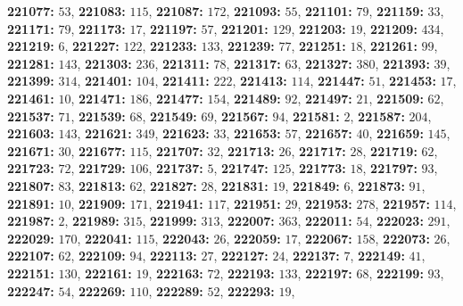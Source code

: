 \textsf{\bfseries 221077:} $53$, \textsf{\bfseries 221083:} $115$, \textsf{\bfseries 221087:} $172$, \textsf{\bfseries 221093:} $55$, \textsf{\bfseries 221101:} $79$, \textsf{\bfseries 221159:} $33$, \textsf{\bfseries 221171:} $79$, \textsf{\bfseries 221173:} $17$, \textsf{\bfseries 221197:} $57$, \textsf{\bfseries 221201:} $129$, \textsf{\bfseries 221203:} $19$, \textsf{\bfseries 221209:} $434$, \textsf{\bfseries 221219:} $6$, \textsf{\bfseries 221227:} $122$, \textsf{\bfseries 221233:} $133$, \textsf{\bfseries 221239:} $77$, \textsf{\bfseries 221251:} $18$, \textsf{\bfseries 221261:} $99$, \textsf{\bfseries 221281:} $143$, \textsf{\bfseries 221303:} $236$, \textsf{\bfseries 221311:} $78$, \textsf{\bfseries 221317:} $63$, \textsf{\bfseries 221327:} $380$, \textsf{\bfseries 221393:} $39$, \textsf{\bfseries 221399:} $314$, \textsf{\bfseries 221401:} $104$, \textsf{\bfseries 221411:} $222$, \textsf{\bfseries 221413:} $114$, \textsf{\bfseries 221447:} $51$, \textsf{\bfseries 221453:} $17$, \textsf{\bfseries 221461:} $10$, \textsf{\bfseries 221471:} $186$, \textsf{\bfseries 221477:} $154$, \textsf{\bfseries 221489:} $92$, \textsf{\bfseries 221497:} $21$, \textsf{\bfseries 221509:} $62$, \textsf{\bfseries 221537:} $71$, \textsf{\bfseries 221539:} $68$, \textsf{\bfseries 221549:} $69$, \textsf{\bfseries 221567:} $94$, \textsf{\bfseries 221581:} $2$, \textsf{\bfseries 221587:} $204$, \textsf{\bfseries 221603:} $143$, \textsf{\bfseries 221621:} $349$, \textsf{\bfseries 221623:} $33$, \textsf{\bfseries 221653:} $57$, \textsf{\bfseries 221657:} $40$, \textsf{\bfseries 221659:} $145$, \textsf{\bfseries 221671:} $30$, \textsf{\bfseries 221677:} $115$, \textsf{\bfseries 221707:} $32$, \textsf{\bfseries 221713:} $26$, \textsf{\bfseries 221717:} $28$, \textsf{\bfseries 221719:} $62$, \textsf{\bfseries 221723:} $72$, \textsf{\bfseries 221729:} $106$, \textsf{\bfseries 221737:} $5$, \textsf{\bfseries 221747:} $125$, \textsf{\bfseries 221773:} $18$, \textsf{\bfseries 221797:} $93$, \textsf{\bfseries 221807:} $83$, \textsf{\bfseries 221813:} $62$, \textsf{\bfseries 221827:} $28$, \textsf{\bfseries 221831:} $19$, \textsf{\bfseries 221849:} $6$, \textsf{\bfseries 221873:} $91$, \textsf{\bfseries 221891:} $10$, \textsf{\bfseries 221909:} $171$, \textsf{\bfseries 221941:} $117$, \textsf{\bfseries 221951:} $29$, \textsf{\bfseries 221953:} $278$, \textsf{\bfseries 221957:} $114$, \textsf{\bfseries 221987:} $2$, \textsf{\bfseries 221989:} $315$, \textsf{\bfseries 221999:} $313$, \textsf{\bfseries 222007:} $363$, \textsf{\bfseries 222011:} $54$, \textsf{\bfseries 222023:} $291$, \textsf{\bfseries 222029:} $170$, \textsf{\bfseries 222041:} $115$, \textsf{\bfseries 222043:} $26$, \textsf{\bfseries 222059:} $17$, \textsf{\bfseries 222067:} $158$, \textsf{\bfseries 222073:} $26$, \textsf{\bfseries 222107:} $62$, \textsf{\bfseries 222109:} $94$, \textsf{\bfseries 222113:} $27$, \textsf{\bfseries 222127:} $24$, \textsf{\bfseries 222137:} $7$, \textsf{\bfseries 222149:} $41$, \textsf{\bfseries 222151:} $130$, \textsf{\bfseries 222161:} $19$, \textsf{\bfseries 222163:} $72$, \textsf{\bfseries 222193:} $133$, \textsf{\bfseries 222197:} $68$, \textsf{\bfseries 222199:} $93$, \textsf{\bfseries 222247:} $54$, \textsf{\bfseries 222269:} $110$, \textsf{\bfseries 222289:} $52$, \textsf{\bfseries 222293:} $19$, 
